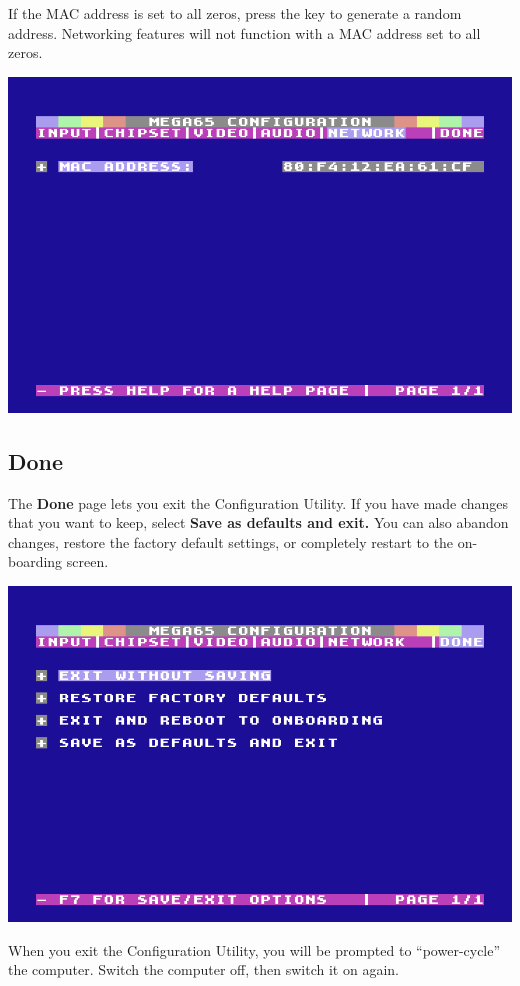 If the MAC address is set to all zeros, press the  key to generate a random address. Networking features will not function with a MAC address set to all zeros.

\begin{center}
  \includegraphics[width=0.7\linewidth]{images/ss-m65config-5.png}
\end{center}

\subsection{Done}

The {\bf Done} page lets you exit the Configuration Utility. If you have made changes that you want to keep, select {\bf Save as defaults and exit.} You can also abandon changes, restore the factory default settings, or completely restart to the on-boarding screen.

\begin{center}
  \includegraphics[width=0.7\linewidth]{images/ss-m65config-save.png}
\end{center}

When you exit the Configuration Utility, you will be prompted to ``power-cycle'' the computer. Switch the computer off, then switch it on again.

